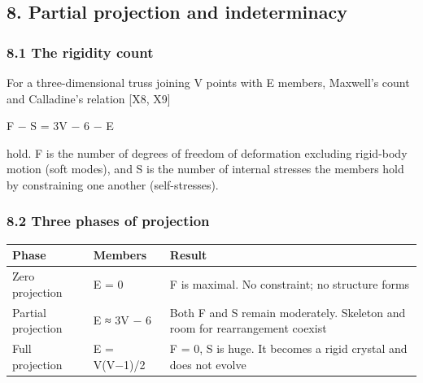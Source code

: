 \documentclass[
  a4paper,
]{article}
\newcounter{none} %
\begin{document}
\subsection{8. Partial projection and
indeterminacy}\label{partial-projection-and-indeterminacy}

\subsubsection{8.1 The rigidity count}\label{the-rigidity-count}

For a three-dimensional truss joining V points with E members, Maxwell's
count and Calladine's relation {[}X8, X9{]}

F − S = 3V − 6 − E

hold. F is the number of degrees of freedom of deformation excluding
rigid-body motion (soft modes), and S is the number of internal stresses
the members hold by constraining one another (self-stresses).

\subsubsection{8.2 Three phases of
projection}\label{three-phases-of-projection}

{\def\LTcaptype{none} %
\begin{longtable}[]{@{}
  >{\raggedright\arraybackslash}p{}
  >{\raggedright\arraybackslash}p{}
  >{\raggedright\arraybackslash}p{}@{}}
\toprule\noalign{}
\begin{minipage}[b]{\linewidth}\raggedright
Phase
\end{minipage} & \begin{minipage}[b]{\linewidth}\raggedright
Members
\end{minipage} & \begin{minipage}[b]{\linewidth}\raggedright
Result
\end{minipage} \\
\midrule\noalign{}
\endhead
\bottomrule\noalign{}
\endlastfoot
Zero projection & E = 0 & F is maximal. No constraint; no structure
forms \\
Partial projection & E ≈ 3V − 6 & Both F and S remain moderately.
Skeleton and room for rearrangement coexist \\
Full projection & E = V(V−1)/2 & F = 0, S is huge. It becomes a rigid
crystal and does not evolve \\
\end{longtable}
}
\end{document}
